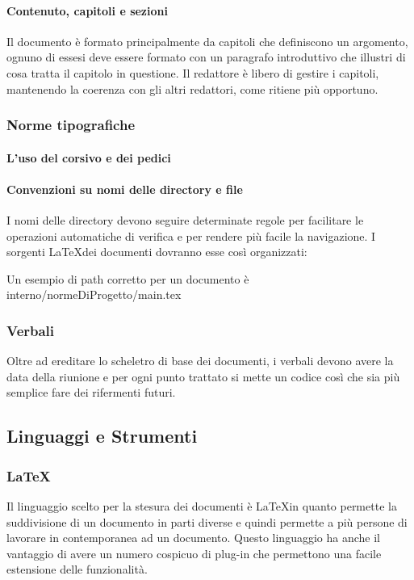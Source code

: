 \paragraph{Contenuto, capitoli e sezioni}
Il documento è formato principalmente da capitoli che definiscono un argomento,
ognuno di essesi deve essere formato con un paragrafo introduttivo che illustri
di cosa tratta il capitolo in questione.
Il redattore è libero di gestire i capitoli, mantenendo la coerenza con gli altri
redattori, come ritiene più opportuno.
\subsubsection{Norme tipografiche}
\paragraph{L'uso del corsivo e dei pedici}

\paragraph{Convenzioni su nomi delle directory e file}
I nomi delle directory devono seguire determinate regole per facilitare le operazioni
automatiche di verifica e per rendere più facile la navigazione.
I sorgenti \LaTeX \space dei documenti dovranno esse così organizzati:


Un esempio di path corretto per un documento è interno/normeDiProgetto/main.tex
\subsubsection{Verbali}
Oltre ad ereditare lo scheletro di base dei documenti, i verbali devono avere la
data della riunione e per ogni punto trattato si mette un codice così che sia più
semplice fare dei rifermenti futuri.

\subsection{Linguaggi e Strumenti}
\subsubsection{\LaTeX}
Il linguaggio scelto per la stesura dei documenti è \LaTeX \space in quanto permette
la suddivisione di un documento in parti diverse e quindi permette a più persone
di lavorare in contemporanea ad un documento.
Questo linguaggio ha anche il vantaggio di avere un numero cospicuo di plug-in
che permettono una facile estensione delle funzionalità.

